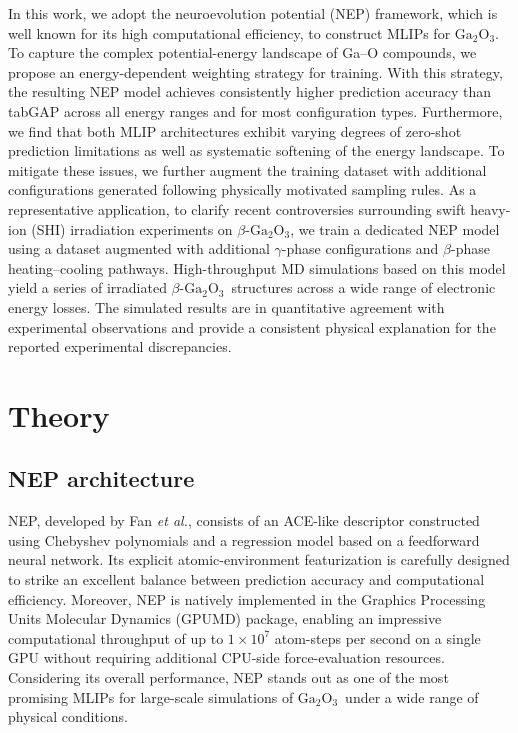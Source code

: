 \documentclass[aip,graphicx,amsmath,amssymb]{revtex4-1}
\newcommand{\ga}{$\text{Ga}_2\text{O}_3$}
\begin{document}
In this work, we adopt the neuroevolution potential (NEP) framework, which is well known
for its high computational efficiency,\cite{xu_gpumd_2025} to construct MLIPs for \ga.
To capture the complex potential-energy landscape of Ga--O compounds, we propose an
energy-dependent weighting strategy for training.
With this strategy, the resulting NEP model achieves consistently higher prediction
accuracy than tabGAP across all energy ranges and for most configuration types.
Furthermore, we find that both MLIP architectures exhibit varying degrees of zero-shot
prediction limitations as well as systematic softening of the energy landscape.
To mitigate these issues, we further augment the training dataset with additional
configurations generated following physically motivated sampling rules.
As a representative application, to clarify recent controversies surrounding swift heavy-ion (SHI) 
irradiation experiments on $\beta$-\ga, we train a dedicated NEP model using a
dataset augmented with additional $\gamma$-phase configurations and $\beta$-phase
heating--cooling pathways.
High-throughput MD simulations based on this model yield a series of irradiated
$\beta$-\ga\ structures across a wide range of electronic energy losses.
The simulated results are in quantitative agreement with experimental observations and
provide a consistent physical explanation for the reported experimental discrepancies.

\section{Theory}

\subsection{NEP architecture}

NEP, developed by Fan \textit{et al.}, consists of an ACE-like descriptor constructed using 
Chebyshev polynomials and a regression model based on 
a feedforward neural network.\cite{fan_neuroevolution_2021,fan_gpumd_2022,song_general-purpose_2024} 
Its explicit atomic-environment featurization is carefully designed to strike an excellent 
balance between prediction accuracy and computational efficiency. 
Moreover, NEP is natively implemented in the Graphics Processing Units Molecular Dynamics 
(GPUMD) package, enabling an impressive computational throughput of up to $1\times10^{7}$ 
atom-steps per second on a single GPU without requiring additional CPU-side force-evaluation
resources.\cite{xu_gpumd_2025} 
Considering its overall performance, NEP stands out as one of the most promising 
MLIPs for large-scale simulations of \ga\ under a wide range of physical conditions.
\end{document}
